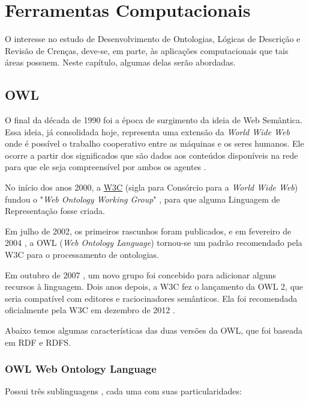\chapter{Ferramentas Computacionais}

\lettrine{O}{} interesse no estudo de Desenvolvimento de Ontologias, Lógicas de Descrição e Revisão de Crenças, deve-se, em parte, às aplicações computacionais que tais áreas possuem. Neste capítulo, algumas delas serão abordadas.

\section{OWL}

O final da década de 1990 foi a época de surgimento da ideia de Web Semântica. Essa ideia, já consolidada hoje, representa uma extensão da \textit{World Wide Web} onde é possível o trabalho cooperativo entre as máquinas e os seres humanos. Ele ocorre a partir dos significados que são dados aos conteúdos disponíveis na rede para que ele seja compreensível por ambos os agentes \cite{ferramentasHerman}.

No início dos anos 2000, a \href{https://www.w3.org}{W3C} (sigla para Consórcio para a \textit{World Wide Web}) fundou o "\textit{Web Ontology Working Group}" \cite{ferramentasGrupo}, para que alguma Linguagem de Representação fosse criada. 

Em julho de 2002, os primeiros rascunhos foram publicados, e em fevereiro de 2004 \cite{ferramentasReco}, a OWL (\textit{Web Ontology Language}) tornou-se um padrão recomendado pela W3C para o processamento de ontologias.

Em outubro de 2007 \cite{ferramentasOWLGrupo2}, um novo grupo foi concebido para adicionar alguns recursos à linguagem. Dois anos depois, a W3C fez o lançamento da OWL 2, que seria compatível com editores e raciocinadores semânticos. Ela foi recomendada oficialmente pela W3C em dezembro de 2012 \cite{ferramentasOWLReco2}.

Abaixo temos algumas características das duas versões da OWL, que foi baseada em RDF e RDFS.

\subsection{OWL Web Ontology Language}

Possui três sublinguagens \cite{ferramentasOWL1}, cada uma com suas particularidades:

